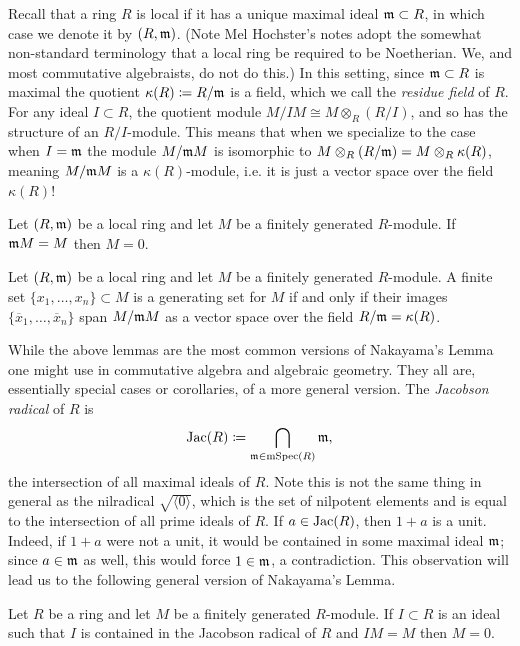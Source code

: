 \documentclass[12pt,reqno]{amsart}
\begin{document}
Recall that a ring $R$ is local if it has a unique maximal ideal $\mathfrak{m} \subset R$, in which case we denote it by $(R,\mathfrak{m})$. (Note Mel Hochster's notes adopt the somewhat non-standard terminology that a local ring be required to be Noetherian. We, and most commutative algebraists, do not do this.) In this setting, since $\mathfrak{m} \subset R$ is maximal the quotient $\kappa(R)\coloneqq R/\mathfrak{m}$ is a field, which we call the \emph{residue field} of $R$. For any ideal $I\subset R$, the quotient module $M/IM \cong M\otimes_{R}(R/I)$, and so has the structure of an $R/I$-module. This means that when we specialize to the case when $I=\mathfrak{m}$ the module $M/\mathfrak{m} M$ is isomorphic to $M\otimes_{R}(R/\mathfrak{m})=M\otimes_{R} \kappa(R)$, meaning $M/\mathfrak{m} M$ is a $\kappa(R)$-module, i.e. it is just a vector space over the field $\kappa(R)$!

\begin{lemma}
	Let $(R, \mathfrak{m})$ be a local ring and let $M$ be a finitely generated $R$-module. If $\mathfrak{m} M = M$ then $M=0$. 
\end{lemma}

\begin{lemma}
	Let $(R, \mathfrak{m})$ be a local ring and let $M$ be a finitely generated $R$-module. A finite set $\{x_1,\ldots,x_n\} \subset M$ is a generating set for $M$ if and only if their images $\{\overline{x}_{1},\ldots,\overline{x}_{n}\}$ span $M/\mathfrak{m} M$ as a vector space over the field $R/\mathfrak{m}=\kappa(R)$.
\end{lemma}

While the above lemmas are the most common versions of Nakayama's Lemma one might use in commutative algebra and algebraic geometry. They all are, essentially special cases or corollaries, of a more general version. The \emph{Jacobson radical} of $R$ is
\[
\operatorname{Jac}(R)\coloneqq \bigcap_{\mathfrak{m}\in \operatorname{mSpec}(R)}\mathfrak{m},
\]
the intersection of all maximal ideals of $R$. Note this is not the same thing in general as the nilradical $\sqrt{\langle 0\rangle}$, which is the set of nilpotent elements and is equal to the intersection of all prime ideals of $R$. If $a\in \operatorname{Jac}(R)$, then $1+a$ is a unit. Indeed, if $1+a$ were not a unit, it would be contained in some maximal ideal $\mathfrak{m}$; since $a\in \mathfrak{m}$ as well, this would force $1\in \mathfrak{m}$, a contradiction. This observation will lead us to the following general version of Nakayama's Lemma.

\begin{lemma}
	Let $R$ be a ring and let $M$ be a finitely generated $R$-module. If $I \subset R$ is an ideal such that $I$ is contained in the Jacobson radical of $R$ and $IM=M$ then $M=0$. 
\end{lemma}
\end{document}
